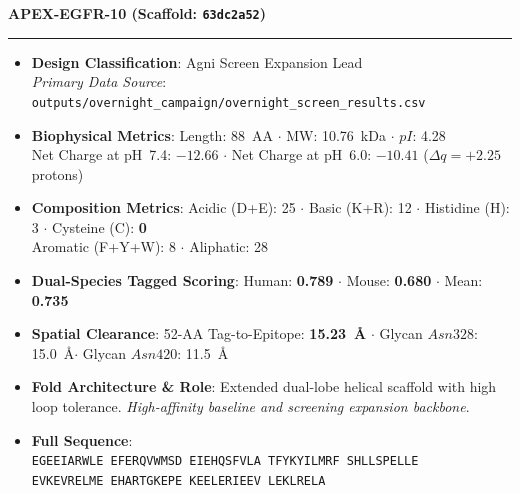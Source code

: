 \documentclass[11pt]{article}
\begin{document}
\noindent\textbf{\color{navyblue}\large APEX-EGFR-10  \quad (Scaffold: \texttt{63dc2a52})} \\
\vspace{-0.4em}
\rule{\textwidth}{0.6pt}
\vspace{-0.2em}
\begin{itemize}
  \setlength{\itemsep}{2pt}
  \setlength{\parskip}{0pt}
  \item \textbf{Design Classification}: Agni Screen Expansion Lead \\
    \textit{Primary Data Source}: \texttt{\small outputs/overnight\_campaign/overnight\_screen\_results.csv}
  \item \textbf{Biophysical Metrics}: Length: 88~AA $\cdot$ MW: 10.76~kDa $\cdot$ $pI$: 4.28 \\
    Net Charge at pH~7.4: $-12.66$ $\cdot$ Net Charge at pH~6.0: $-10.41$ ($\Delta q = +2.25$ protons)
  \item \textbf{Composition Metrics}: Acidic (D+E): 25 $\cdot$ Basic (K+R): 12 $\cdot$ Histidine (H): 3 $\cdot$ Cysteine (C): \textbf{0} \\
    Aromatic (F+Y+W): 8 $\cdot$ Aliphatic: 28
  \item \textbf{Dual-Species Tagged Scoring}: Human: \textbf{0.789} $\cdot$ Mouse: \textbf{0.680} $\cdot$ Mean: \textbf{0.735}
  \item \textbf{Spatial Clearance}: 52-AA Tag-to-Epitope: \textbf{15.23~\AA} $\cdot$ Glycan $Asn328$: 15.0~\AA $\cdot$ Glycan $Asn420$: 11.5~\AA
  \item \textbf{Fold Architecture \& Role}: Extended dual-lobe helical scaffold with high loop tolerance. \textit{High-affinity baseline and screening expansion backbone}.
  \item \textbf{Full Sequence}: \\
    \texttt{\small EGEEIARWLE EFERQVWMSD EIEHQSFVLA TFYKYILMRF SHLLSPELLE \\
    EVKEVRELME EHARTGKEPE KEELERIEEV LEKLRELA}
\end{itemize}
\vspace{0.8em}
\end{document}
